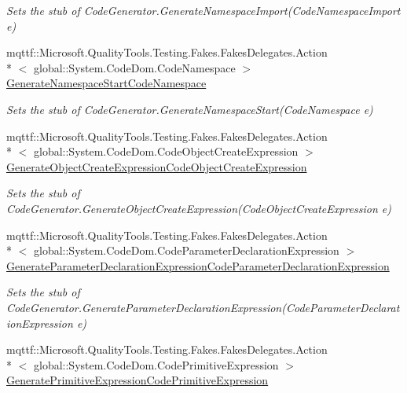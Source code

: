 \begin{DoxyCompactItemize}
\begin{DoxyCompactList}\small\item\em Sets the stub of Code\-Generator.\-Generate\-Namespace\-Import(\-Code\-Namespace\-Import e)\end{DoxyCompactList}\item 
mqttf\-::\-Microsoft.\-Quality\-Tools.\-Testing.\-Fakes.\-Fakes\-Delegates.\-Action\\*
$<$ global\-::\-System.\-Code\-Dom.\-Code\-Namespace $>$ \hyperlink{class_system_1_1_code_dom_1_1_compiler_1_1_fakes_1_1_stub_code_compiler_a63f58c0d163765c6a0765f11a476bb21}{Generate\-Namespace\-Start\-Code\-Namespace}
\begin{DoxyCompactList}\small\item\em Sets the stub of Code\-Generator.\-Generate\-Namespace\-Start(\-Code\-Namespace e)\end{DoxyCompactList}\item 
mqttf\-::\-Microsoft.\-Quality\-Tools.\-Testing.\-Fakes.\-Fakes\-Delegates.\-Action\\*
$<$ global\-::\-System.\-Code\-Dom.\-Code\-Object\-Create\-Expression $>$ \hyperlink{class_system_1_1_code_dom_1_1_compiler_1_1_fakes_1_1_stub_code_compiler_aaaab300ae1eb1078bbdc62498b89fddf}{Generate\-Object\-Create\-Expression\-Code\-Object\-Create\-Expression}
\begin{DoxyCompactList}\small\item\em Sets the stub of Code\-Generator.\-Generate\-Object\-Create\-Expression(\-Code\-Object\-Create\-Expression e)\end{DoxyCompactList}\item 
mqttf\-::\-Microsoft.\-Quality\-Tools.\-Testing.\-Fakes.\-Fakes\-Delegates.\-Action\\*
$<$ global\-::\-System.\-Code\-Dom.\-Code\-Parameter\-Declaration\-Expression $>$ \hyperlink{class_system_1_1_code_dom_1_1_compiler_1_1_fakes_1_1_stub_code_compiler_a6e47008e6a9aec75bc9d7f41b808050d}{Generate\-Parameter\-Declaration\-Expression\-Code\-Parameter\-Declaration\-Expression}
\begin{DoxyCompactList}\small\item\em Sets the stub of Code\-Generator.\-Generate\-Parameter\-Declaration\-Expression(\-Code\-Parameter\-Declaration\-Expression e)\end{DoxyCompactList}\item 
mqttf\-::\-Microsoft.\-Quality\-Tools.\-Testing.\-Fakes.\-Fakes\-Delegates.\-Action\\*
$<$ global\-::\-System.\-Code\-Dom.\-Code\-Primitive\-Expression $>$ \hyperlink{class_system_1_1_code_dom_1_1_compiler_1_1_fakes_1_1_stub_code_compiler_a93eb82a93698053ec2fd943976524130}{Generate\-Primitive\-Expression\-Code\-Primitive\-Expression}

\end{DoxyCompactItemize}
